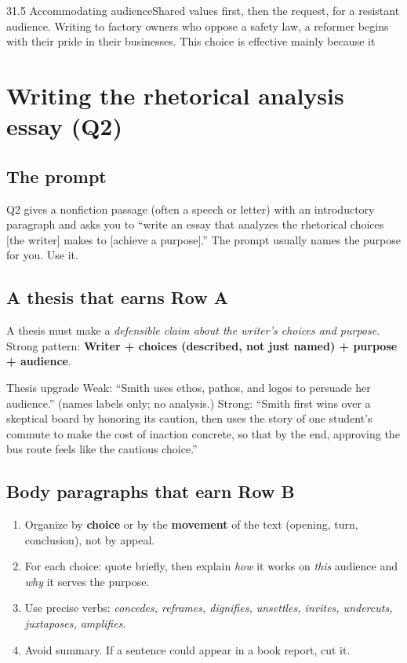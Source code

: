 \documentclass[11pt]{article}
\begin{document}
\begin{q}{3}{1.5 Accommodating audience}{Shared values first, then the request, for a resistant audience.}
Writing to factory owners who oppose a safety law, a reformer begins with their pride in their businesses. This choice is effective mainly because it
\end{q}

\section{Writing the rhetorical analysis essay (Q2)}

\subsection{The prompt}
Q2 gives a nonfiction passage (often a speech or letter) with an introductory paragraph and asks you to ``write an essay that analyzes the rhetorical choices [the writer] makes to [achieve a purpose].'' The prompt usually names the purpose for you. Use it.

\subsection{A thesis that earns Row A}
A thesis must make a \emph{defensible claim about the writer's choices and purpose}. Strong pattern: \textbf{Writer + choices (described, not just named) + purpose + audience}.

\begin{study}{Thesis upgrade}
Weak: ``Smith uses ethos, pathos, and logos to persuade her audience.'' (names labels only; no analysis.)
Strong: ``Smith first wins over a skeptical board by honoring its caution, then uses the story of one student's commute to make the cost of inaction concrete, so that by the end, approving the bus route feels like the cautious choice.''
\end{study}

\subsection{Body paragraphs that earn Row B}
\begin{enumerate}[leftmargin=1.5em]
\item Organize by \textbf{choice} or by the \textbf{movement} of the text (opening, turn, conclusion), not by appeal.
\item For each choice: quote briefly, then explain \emph{how} it works on \emph{this} audience and \emph{why} it serves the purpose.
\item Use precise verbs: \emph{concedes, reframes, dignifies, unsettles, invites, undercuts, juxtaposes, amplifies}.
\item Avoid summary. If a sentence could appear in a book report, cut it.
\end{enumerate}
\end{document}
